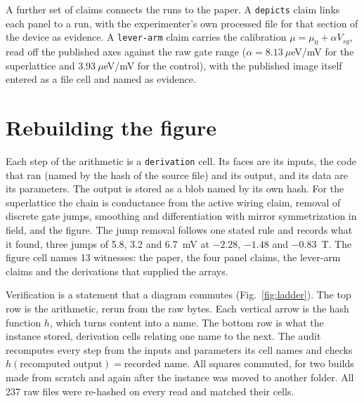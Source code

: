 \documentclass[11pt]{article}
\newcommand{\cellname}[1]{\texttt{#1}}
\begin{document}
A further set of claims connects the runs to the paper. A \cellname{depicts} claim links each panel to a run, with the experimenter's own processed file for that section of the device as evidence. A \cellname{lever-arm} claim carries the calibration $\mu = \mu_0 + \alpha V_{sg}$, read off the published axes against the raw gate range ($\alpha = 8.13~\mu$eV/mV for the superlattice and $3.93~\mu$eV/mV for the control), with the published image itself entered as a file cell and named as evidence.

\section{Rebuilding the figure}

Each step of the arithmetic is a \cellname{derivation} cell. Its faces are its inputs, the code that ran (named by the hash of the source file) and its output, and its data are its parameters. The output is stored as a blob named by its own hash. For the superlattice the chain is conductance from the active wiring claim, removal of discrete gate jumps, smoothing and differentiation with mirror symmetrization in field, and the figure. The jump removal follows one stated rule and records what it found, three jumps of 5.8, 3.2 and 6.7~mV at $-2.28$, $-1.48$ and $-0.83$~T. The figure cell names 13 witnesses: the paper, the four panel claims, the lever-arm claims and the derivations that supplied the arrays.

Verification is a statement that a diagram commutes (Fig.~\ref{fig:ladder}). The top row is the arithmetic, rerun from the raw bytes. Each vertical arrow is the hash function $h$, which turns content into a name. The bottom row is what the instance stored, derivation cells relating one name to the next. The audit recomputes every step from the inputs and parameters its cell names and checks $h(\text{recomputed output}) = \text{recorded name}$. All squares commuted, for two builds made from scratch and again after the instance was moved to another folder. All 237 raw files were re-hashed on every read and matched their cells.
\end{document}
